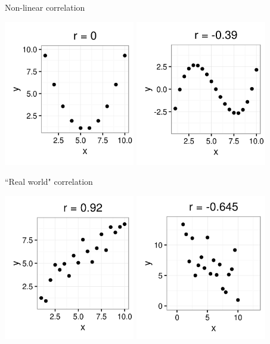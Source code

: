 \documentclass[xcolor=table, handout]{beamer}
\begin{document}
\begin{frame}{Non-linear correlation}

{\centering
\includegraphics[width=2.25in]{../images/ch10_cor_para}
\pause\includegraphics[width=2.25in]{../images/ch10_cor_cube}
\par}
\end{frame}

\begin{frame}{``Real world" correlation}

{\centering
\includegraphics[width=2.25in]{../images/ch10_cor_pos3}
\pause\includegraphics[width=2.25in]{../images/ch10_cor_neg3}
\par}
\end{frame}
\end{document}

